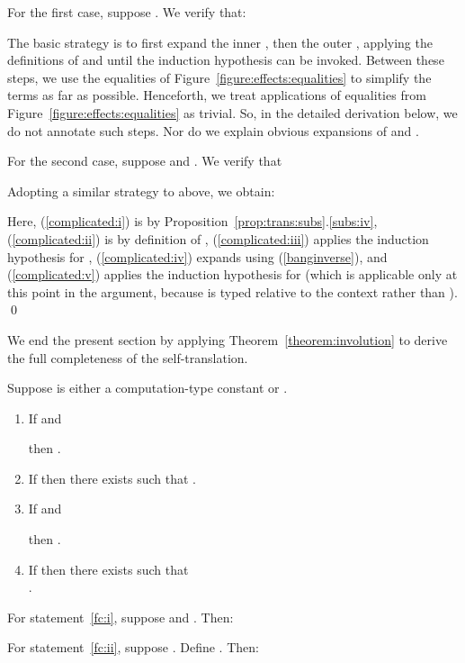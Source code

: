\documentclass{LMCS}
\begin{document}
For the first case, suppose . We verify that:

The basic strategy is to first expand the inner , then the
outer , applying the 
definitions of  and
 until the induction hypothesis can be invoked.
Between these steps, we use 
the equalities of Figure~\ref{figure:effects:equalities} to simplify the terms as far as possible.
Henceforth, we treat applications of equalities from
Figure~\ref{figure:effects:equalities} as trivial. So, in the detailed
derivation below, we do not annotate such steps. Nor do we explain 
obvious expansions of  and .


For the second case, suppose  and 
. We verify that

Adopting a similar strategy to above, we obtain:

Here, (\ref{complicated:i}) is by Proposition~\ref{prop:trans:subs}.\ref{subs:iv},
 (\ref{complicated:ii}) is by definition of ,
 (\ref{complicated:iii}) applies the induction hypothesis for ,
 (\ref{complicated:iv}) expands  
using (\ref{banginverse}), and 
 (\ref{complicated:v}) applies the induction hypothesis for  (which is applicable only 
at this point in the argument, because  is typed 
relative to the context  rather than ).
\qed

We end the present section by applying Theorem~\ref{theorem:involution}
to derive the full completeness of
the self-translation.



\begin{thm} 
\label{thm:full:complete}
Suppose  is either a computation-type constant or .
\begin{enumerate}[\em(1)]
\item \label{fc:i}
  If  and 
 
then .

\item \label{fc:ii}
       If  
       then there exists   such that 
.

\item \label{fc:iii}
If  and  

then .

\item \label{fc:iv}
If  then there exists 
 such that \\
.
\end{enumerate}
\end{thm}
\proof
For statement~\ref{fc:i}, suppose  and . Then:

\noindent
For statement~\ref{fc:ii}, suppose .
Define . Then:
\end{document}

